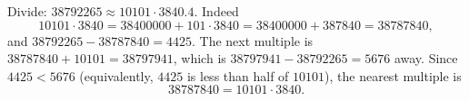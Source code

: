 Divide: $38792265\approx 10101\cdot3840.4$. Indeed
\[
10101\cdot3840=38400000+101\cdot3840=38400000+387840=38787840,
\]
and $38792265-38787840=4425$. The next multiple is $38787840+10101=38797941$, which is $38797941-38792265=5676$ away. Since $4425<5676$ (equivalently, $4425$ is less than half of $10101$), the nearest multiple is
\[
\boxed{38787840}=10101\cdot3840 .
\]

